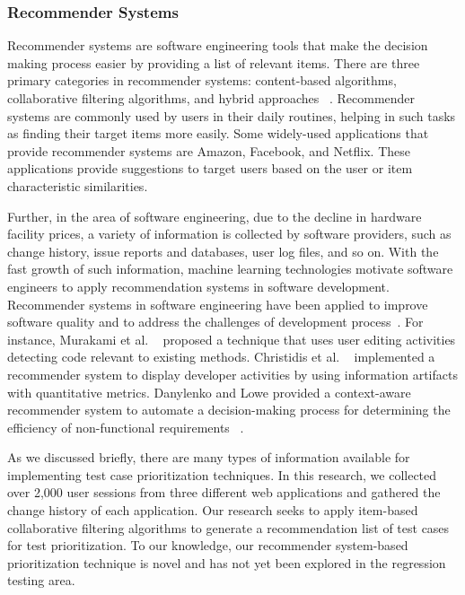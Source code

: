 \subsubsection*{Recommender Systems}  
Recommender systems are software engineering tools that make 
the decision making process easier by providing a list of relevant items.
There are three primary  categories in recommender systems:
content-based algorithms, collaborative filtering algorithms, and hybrid approaches ~\cite{recomsurvey05}.  
Recommender systems are commonly used by users in their daily routines, 
helping in such tasks as finding 
their target items more easily.
Some widely-used applications that provide recommender systems
are Amazon, Facebook, and Netflix. These applications provide suggestions
to target users based on the user or item characteristic similarities.  

Further, in the area of software engineering, due to the decline in hardware 
facility prices, a variety of information is collected by software 
providers, such as change history, issue reports and databases, user log files, 
and so on.
With the fast growth of such information, machine learning technologies  
motivate software engineers to apply recommendation systems in software 
development. Recommender systems in software engineering have been applied  
to improve software quality and to address the challenges of development process~\cite{rssebook}.  
For instance, Murakami et al. ~\cite{murakami} proposed a technique that 
uses user editing activities  detecting code relevant to existing methods. 
Christidis et al. ~\cite{costas} implemented a recommender system 
to display developer activities by using information artifacts with quantitative metrics. 
Danylenko and Lowe provided a context-aware recommender system 
to automate a decision-making process for determining the efficiency of 
non-functional requirements ~\cite{contextawar}.

As we discussed briefly, there are many types of information available 
for implementing test case prioritization techniques.
In this research, we collected over 2,000 user sessions from 
three different web applications and gathered the change history of each application. 
Our research seeks to apply item-based collaborative filtering algorithms 
to generate a recommendation list of test cases for 
test prioritization.
To our knowledge, our recommender system-based prioritization technique is novel 
and has not yet been explored in the regression testing area.

